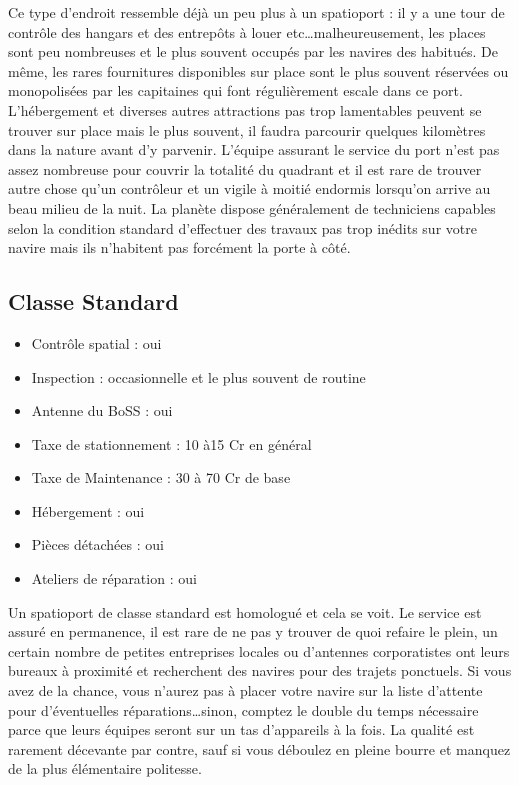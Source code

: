 \documentclass{article}
\begin{document}
Ce type d'endroit ressemble déjà un peu plus à un spatioport : il y a une tour de contrôle des hangars et des entrepôts à louer etc\ldots malheureusement, les places sont peu nombreuses et le plus souvent occupés par les navires des habitués. De même, les rares fournitures disponibles sur place sont le plus souvent réservées ou monopolisées par les capitaines qui font régulièrement escale dans ce port. L'hébergement et diverses autres attractions pas trop lamentables peuvent se trouver sur place mais le plus souvent, il faudra parcourir quelques kilomètres dans la nature avant d'y parvenir. L'équipe assurant le service du port n'est pas assez nombreuse pour couvrir la totalité du quadrant et il est rare de trouver autre chose qu'un contrôleur et un vigile à moitié endormis lorsqu'on arrive au beau milieu de la nuit. La planète dispose généralement de techniciens capables selon la condition standard d'effectuer des travaux pas trop inédits sur votre navire mais ils n'habitent pas forcément la porte à côté.

\subsection*{Classe Standard}
\begin{itemize}
	\item Contrôle spatial : oui
	\item Inspection : occasionnelle et le plus souvent de routine
	\item Antenne du BoSS : oui
	\item Taxe de stationnement : 10 à15 Cr en général
	\item Taxe de Maintenance : 30 à 70 Cr de base
	\item Hébergement : oui
	\item Pièces détachées : oui
	\item Ateliers de réparation : oui \\
\end{itemize}

Un spatioport de classe standard est homologué et cela se voit. Le service est assuré en permanence, il est rare de ne pas y trouver de quoi refaire le plein, un certain nombre de petites entreprises locales ou d'antennes corporatistes ont leurs bureaux à proximité et recherchent des navires pour des trajets ponctuels. Si vous avez de la chance, vous n'aurez pas à placer votre navire sur la liste d'attente pour d'éventuelles réparations\ldots sinon, comptez le double du temps nécessaire parce que leurs équipes seront sur un tas d'appareils à la fois. La qualité est rarement décevante par contre, sauf si vous déboulez en pleine bourre et manquez de la plus élémentaire politesse.
\end{document}
